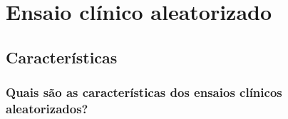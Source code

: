 \documentclass[
  a4paper,
]{book}
\begin{document}
\hypertarget{ensaio-cluxednico-aleatorizado}{%
\chapter{\texorpdfstring{\textbf{Ensaio clínico aleatorizado}}{Ensaio clínico aleatorizado}}\label{ensaio-cluxednico-aleatorizado}}

\hypertarget{caracteristicas}{%
\section{Características}\label{caracteristicas}}

\hypertarget{quais-suxe3o-as-caracteruxedsticas-dos-ensaios-cluxednicos-aleatorizados}{%
\subsection{Quais são as características dos ensaios clínicos aleatorizados?}\label{quais-suxe3o-as-caracteruxedsticas-dos-ensaios-cluxednicos-aleatorizados}}
\end{document}
